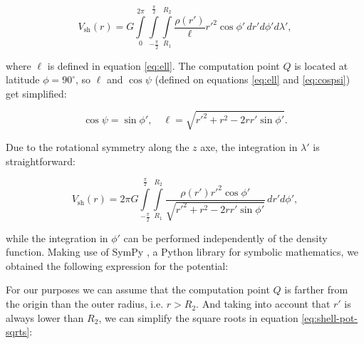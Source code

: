 \documentclass[extra]{gji}
\begin{document}
\begin{equation}
    V_\text{sh}(r) = G 
    \int\limits_0^{2\pi}
    \int\limits_{-\frac{\pi}{2}}^\frac{\pi}{2}
    \int\limits_{R_1}^{R_2}
    \frac{\rho(r')}{\ell} {r'}^2 \cos\phi' \, 
    dr' d\phi' d\lambda',
\end{equation}

\noindent where $\ell$ is defined in equation \ref{eq:ell}. The computation 
point $Q$ is located at latitude $\phi=90^\circ$, so $\ell$ and $\cos\psi$ 
(defined on equations \ref{eq:ell} and \ref{eq:cospsi}) get simplified:

\begin{equation}
    \cos\psi = \sin\phi', \quad
    \ell = \sqrt{r'^2 + r^2 - 2 r r' \sin\phi'}.
\end{equation}

Due to the rotational symmetry along the $z$ axe, the integration in 
$\lambda'$ is straightforward:

\begin{equation}
    V_\text{sh}(r) = 2\pi G 
    \int\limits_{-\frac{\pi}{2}}^\frac{\pi}{2}
    \int\limits_{R_1}^{R_2}
    \frac{\rho(r') {r'}^2 \cos\phi'}{\sqrt{r'^2 + r^2 - 2 r r' \sin\phi'}}
    \, dr' d\phi',
\end{equation}

\noindent while the integration in $\phi'$ can be performed 
independently of the density function.
Making use of SymPy \citep{sympy2017}, a Python library for symbolic 
mathematics, we obtained the following expression for the potential:


For our purposes we can assume that the computation point $Q$ is 
farther from the origin than the outer radius, i.e. $r>R_2$. 
And taking into account that $r'$ is always lower than $R_2$, we can 
simplify the square roots in equation \ref{eq:shell-pot-sqrts}:
\end{document}
